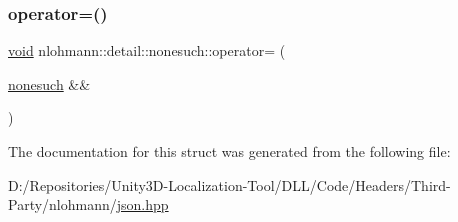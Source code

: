 \subsubsection{\texorpdfstring{operator=()}{operator=()}\hspace{0.1cm}{\footnotesize\ttfamily [2/2]}}
{\footnotesize\ttfamily \mbox{\hyperlink{namespacenlohmann_1_1detail_a59fca69799f6b9e366710cb9043aa77d}{void}} nlohmann\+::detail\+::nonesuch\+::operator= (\begin{DoxyParamCaption}\item[{\mbox{\hyperlink{structnlohmann_1_1detail_1_1nonesuch}{nonesuch}} \&\&}]{ }\end{DoxyParamCaption})\hspace{0.3cm}{\ttfamily [delete]}}



The documentation for this struct was generated from the following file\+:\begin{DoxyCompactItemize}
\item 
D\+:/\+Repositories/\+Unity3\+D-\/\+Localization-\/\+Tool/\+D\+L\+L/\+Code/\+Headers/\+Third-\/\+Party/nlohmann/\mbox{\hyperlink{json_8hpp}{json.\+hpp}}\end{DoxyCompactItemize}
